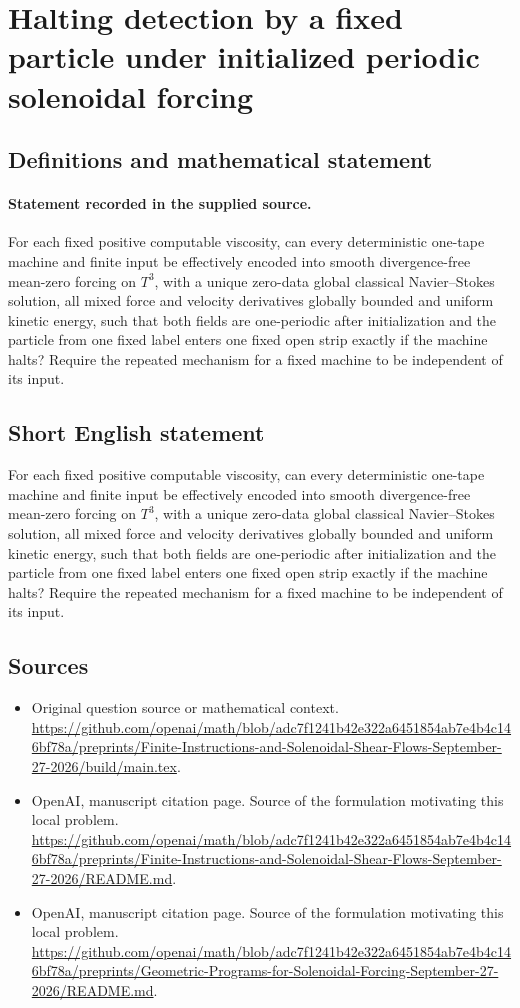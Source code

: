 \documentclass[11pt]{article}
\begin{document}
\section*{Halting detection by a fixed particle under initialized periodic solenoidal forcing}\label{30007333}
\subsection{Definitions and mathematical statement}
\paragraph{Statement recorded in the supplied source.}
For each fixed positive computable viscosity, can every deterministic one-tape machine and finite input be effectively encoded into smooth divergence-free mean-zero forcing on $T^3$, with a unique zero-data global classical Navier–Stokes solution, all mixed force and velocity derivatives globally bounded and uniform kinetic energy, such that both fields are one-periodic after initialization and the particle from one fixed label enters one fixed open strip exactly if the machine halts? Require the repeated mechanism for a fixed machine to be independent of its input.
\subsection{Short English statement}
For each fixed positive computable viscosity, can every deterministic one-tape machine and finite input be effectively encoded into smooth divergence-free mean-zero forcing on $T^3$, with a unique zero-data global classical Navier–Stokes solution, all mixed force and velocity derivatives globally bounded and uniform kinetic energy, such that both fields are one-periodic after initialization and the particle from one fixed label enters one fixed open strip exactly if the machine halts? Require the repeated mechanism for a fixed machine to be independent of its input.
\subsection{Sources}
\begin{itemize}
\item[S1] Original question source or mathematical context.
\url{https://github.com/openai/math/blob/adc7f1241b42e322a6451854ab7e4b4c146bf78a/preprints/Finite-Instructions-and-Solenoidal-Shear-Flows-September-27-2026/build/main.tex}.
\item[S2] OpenAI, manuscript citation page. Source of the formulation motivating this local problem.
\url{https://github.com/openai/math/blob/adc7f1241b42e322a6451854ab7e4b4c146bf78a/preprints/Finite-Instructions-and-Solenoidal-Shear-Flows-September-27-2026/README.md}.
\item[S3] OpenAI, manuscript citation page. Source of the formulation motivating this local problem.
\url{https://github.com/openai/math/blob/adc7f1241b42e322a6451854ab7e4b4c146bf78a/preprints/Geometric-Programs-for-Solenoidal-Forcing-September-27-2026/README.md}.
\end{itemize}
\end{document}
